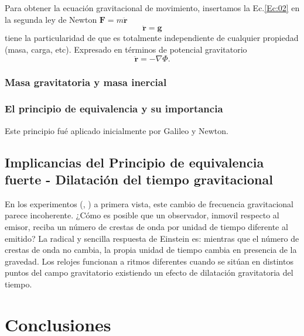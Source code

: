 \documentclass[12pt,twoside]{rif}
\begin{document}
			Para obtener la ecuación gravitacional de movimiento, insertamos la Ec.\ref*{Ec:02} en la segunda ley de Newton $\mathbf{F}=m\mathbf{\ddot{r}}$
			\begin{equation}
				\mathbf{\ddot{r}}
				=
				\mathbf{g}
				\label{Ec:08}
			\end{equation}
			tiene la particularidad de que es totalmente independiente de cualquier propiedad (masa, carga, etc). Expresado en términos de potencial gravitatorio 
			\begin{equation}
				\mathbf{\ddot{r}}
				=
				- \nabla \Phi.
			\end{equation}


			\subsubsection{Masa gravitatoria y masa inercial}
			
			\subsubsection{El principio de equivalencia y su importancia}

				Este principio fué aplicado inicialmente por Galileo y Newton.

			\subsection{Implicancias del Principio de equivalencia fuerte - Dilatación del tiempo gravitacional}
			En los experimentos (\citet*{PoundRebka1960}, \citet*{PoundSnider1964}) a primera vista, este cambio de frecuencia gravitacional parece incoherente. ¿Cómo es posible que un observador, inmovil respecto al emisor, reciba un número de crestas de onda por unidad de tiempo diferente al emitido? La radical y sencilla respuesta de Einstein es: mientras que el número de crestas de onda no cambia, la propia unidad de tiempo cambia en presencia de la gravedad. Los relojes funcionan a ritmos diferentes cuando se sitúan en distintos puntos del campo gravitatorio existiendo un efecto de dilatación gravitatoria del tiempo.

	\section{Conclusiones}
	
	\nocite{*}
	
	
	
\end{document}
